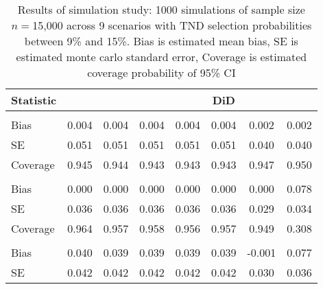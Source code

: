 \begin{appendix}
\begin{table}
\centering
\caption{Results of simulation study: 1000 simulations of sample size $n=$15,000 across 9 scenarios with TND selection probabilities between 9\% and 15\%. Bias is estimated mean bias, SE is estimated monte carlo standard error, Coverage is estimated coverage probability of 95\% CI}
\begin{tabular}{lS[table-format = 1.3]S[table-format = 1.3]S[table-format = 1.3]S[table-format = 1.3]S[table-format = 1.3]S[table-format = 1.3]S[table-format = 1.3]}
\toprule
Statistic & {} & {} & {} & {} & {DiD} & {} & {}\\
\midrule
\addlinespace[0.3em]
\\
\hspace{1em}Bias & 0.004 & 0.004 & 0.004 & 0.004 & 0.004 & 0.002 & 0.002\\
\hspace{1em}SE & 0.051 & 0.051 & 0.051 & 0.051 & 0.051 & 0.040 & 0.040\\
\hspace{1em}Coverage & 0.945 & 0.944 & 0.943 & 0.943 & 0.943 & 0.947 & 0.950\\
\addlinespace[0.3em]
\\
\hspace{1em}Bias & 0.000 & 0.000 & 0.000 & 0.000 & 0.000 & 0.000 & 0.078\\
\hspace{1em}SE & 0.036 & 0.036 & 0.036 & 0.036 & 0.036 & 0.029 & 0.034\\
\hspace{1em}Coverage & 0.964 & 0.957 & 0.958 & 0.956 & 0.957 & 0.949 & 0.308\\
\addlinespace[0.3em]
\\
\hspace{1em}Bias & 0.040 & 0.039 & 0.039 & 0.039 & 0.039 & -0.001 & 0.077\\
\hspace{1em}SE & 0.042 & 0.042 & 0.042 & 0.042 & 0.042 & 0.030 & 0.036\\

\end{tabular}
\end{table}
\end{appendix}
